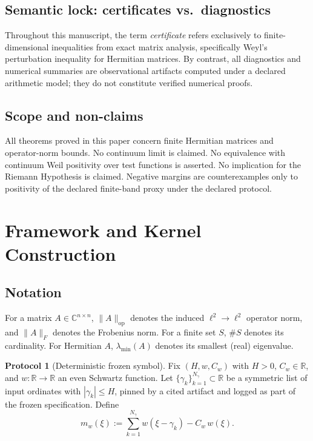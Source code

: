 \documentclass[12pt,reqno]{amsart}
\numberwithin{equation}{section}
\theoremstyle{definition}
\newtheorem{protocol}[theorem]{Protocol}
\theoremstyle{remark}
\newcommand{\RR}{\mathbb{R}}
\newcommand{\CC}{\mathbb{C}}
\begin{document}
\subsection{Semantic lock: certificates vs.\ diagnostics}

Throughout this manuscript, the term \emph{certificate} refers exclusively to
finite-dimensional inequalities from exact matrix analysis, specifically Weyl's
perturbation inequality for Hermitian matrices. By contrast, all diagnostics and
numerical summaries are observational artifacts computed under a declared arithmetic
model; they do not constitute verified numerical proofs.

\subsection{Scope and non-claims}

All theorems proved in this paper concern finite Hermitian matrices and operator-norm
bounds. No continuum limit is claimed. No equivalence with continuum Weil positivity
over test functions is asserted. No implication for the Riemann Hypothesis is claimed.
Negative margins are counterexamples only to positivity of the declared finite-band
proxy under the declared protocol.

\section{Framework and Kernel Construction}
\label{sec:framework}

\subsection*{Notation}

For a matrix $A\in\CC^{n\times n}$, $\|A\|_{\mathrm{op}}$ denotes the induced
$\ell^2\to\ell^2$ operator norm, and $\|A\|_F$ denotes the Frobenius norm.
For a finite set $S$, $\#S$ denotes its cardinality. For Hermitian $A$,
$\lambda_{\min}(A)$ denotes its smallest (real) eigenvalue.

\begin{protocol}[Deterministic frozen symbol]
\label{proto:frozen}
Fix $(H,w,C_w)$ with $H>0$, $C_w\in\RR$, and
$w:\RR\to\RR$ an even Schwartz function.
Let $\{\gamma_k\}_{k=1}^{N_\gamma}\subset\RR$ be a symmetric list of input ordinates
with $|\gamma_k|\le H$, pinned by a cited artifact and logged as part of the frozen
specification. Define
\begin{equation}
\label{eq:mw}
m_w(\xi) := \sum_{k=1}^{N_\gamma} w(\xi-\gamma_k) - C_w\,w(\xi).
\end{equation}
\end{protocol}
\end{document}

